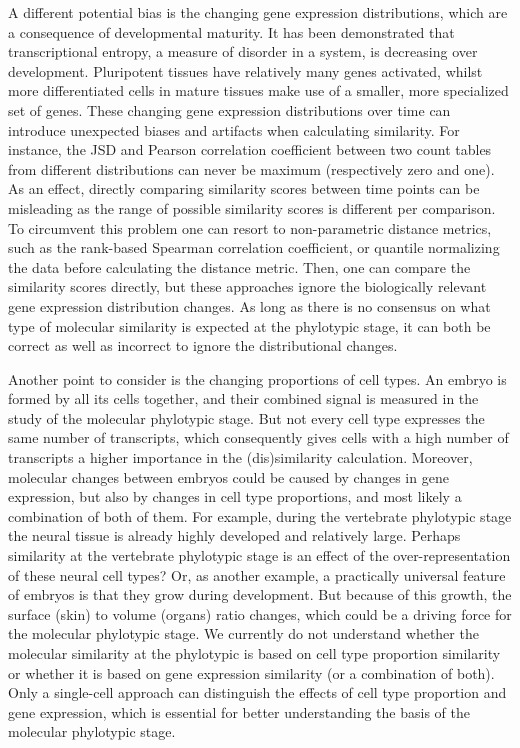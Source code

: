 A different potential bias is the changing gene expression distributions, which are a consequence of developmental maturity. It has been demonstrated that transcriptional entropy, a measure of disorder in a system, is decreasing over development\cite{Kannan2021}. Pluripotent tissues have relatively many genes activated, whilst more differentiated cells in mature tissues make use of a smaller, more specialized set of genes. These changing gene expression distributions over time can introduce unexpected biases and artifacts when calculating similarity. For instance, the JSD and Pearson correlation coefficient between two count tables from different distributions can never be maximum (respectively zero and one). As an effect, directly comparing similarity scores between time points can be misleading as the range of possible similarity scores is different per comparison. To circumvent this problem one can resort to non-parametric distance metrics, such as the rank-based Spearman correlation coefficient\cite{Irie2011}, or quantile normalizing the data before calculating the distance metric\cite{marletaz2018}. Then, one can compare the similarity scores directly, but these approaches ignore the biologically relevant gene expression distribution changes. As long as there is no consensus on what type of molecular similarity is expected at the phylotypic stage, it can both be correct as well as incorrect to ignore the distributional changes. 

Another point to consider is the changing proportions of cell types. An embryo is formed by all its cells together, and their combined signal is measured in the study of the molecular phylotypic stage. But not every cell type expresses the same number of transcripts\cite{Kim2023, Percharde2017}, which consequently gives cells with a high number of transcripts a higher importance in the (dis)similarity calculation. Moreover, molecular changes between embryos could be caused by changes in gene expression, but also by changes in cell type proportions, and most likely a combination of both of them. For example, during the vertebrate phylotypic stage the neural tissue is already highly developed and relatively large. Perhaps similarity at the vertebrate phylotypic stage is an effect of the over-representation of these neural cell types? Or, as another example, a practically universal feature of embryos is that they grow during development. But because of this growth, the surface (skin) to volume (organs) ratio changes, which could be a driving force for the molecular phylotypic stage. We currently do not understand whether the molecular similarity at the phylotypic is based on cell type proportion similarity or whether it is based on gene expression similarity (or a combination of both). Only a single-cell approach can distinguish the effects of cell type proportion and gene expression, which is essential for better understanding the basis of the molecular phylotypic stage.

